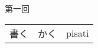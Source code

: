 \documentclass[intermediate]{grampig}
\begin{document}
	{\Large {} \hfill 第一回} \vspace{1em}
	\parbox[t]{\linewidth}{\vphantom{A}}
	\begin{table}
		\centering
		\begin{tabular}{ccc}
			書く & かく & pisati \\
		\end{tabular}
	\end{table}
\end{document}

